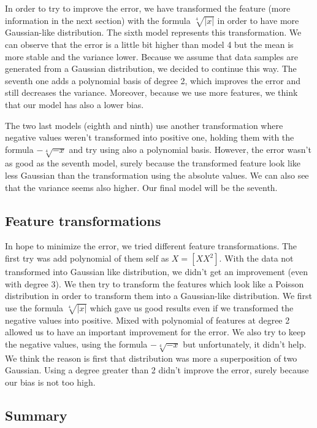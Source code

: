 \documentclass{article} %
\begin{document}
In order to try to improve the error, we have transformed the feature (more information in the next section) with the formula $\sqrt[4]{|x|}$ in order to have more Gaussian-like distribution. The sixth model represents this transformation. We can observe that the error is a little bit higher than model 4 but the mean is more stable and the variance lower. Because we assume that data samples are generated from a Gaussian distribution, we decided to continue this way. The seventh one adds a polynomial basis of degree 2, which improves the error and still decreases the variance. Moreover, because we use more features, we think that our model has also a lower bias.

The two last models (eighth and ninth) use another transformation where negative values weren't transformed into positive one, holding them with the formula $-\sqrt[4]{-x}$ and try using also a polynomial basis. However, the error wasn't as good as the seventh model, surely because the transformed feature look like less Gaussian than the transformation using the absolute values. We can also see that the variance seems also higher.
Our final model will be the seventh.

\subsection{Feature transformations}

In hope to minimize the error, we tried different feature transformations. The first try was add polynomial of them self as $X = [X X^2]$. With the data not transformed into Gaussian like distribution, we didn't get an improvement (even with degree 3). We then try to transform the features which look like a Poisson distribution in order to transform them into a Gaussian-like distribution. We first use the formula $\sqrt[4]{|x|}$ which gave us good results even if we transformed the negative values into positive. Mixed with polynomial of features at degree 2 allowed us to have an important improvement for the error. We also try to keep the negative values, using the formula $-\sqrt[4]{-x}$ but unfortunately, it didn't help. We think the reason is first that distribution was more a superposition of two Gaussian. Using a degree greater than 2 didn't improve the error, surely because our bias is not too high.

\subsection{Summary}
\end{document}
